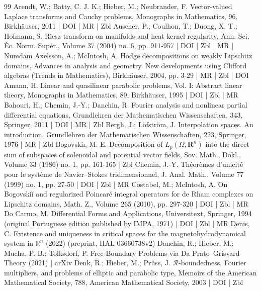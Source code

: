 \begin{thebibliography}{99}
 Arendt, W.; Batty, C. J. K.; Hieber, M.; Neubrander, F. Vector-valued Laplace transforms and Cauchy problems, Monographs in Mathematics, 96, Birkhäuser, 2011 | DOI | MR | Zbl
 Auscher, P.; Coulhon, T.; Duong, X. T.; Hofmann, S. Riesz transform on manifolds and heat kernel regularity, Ann. Sci. Éc. Norm. Supér., Volume 37 (2004) no. 6, pp. 911-957 | DOI | Zbl | MR | Numdam
 Axelsson, A.; McIntosh, A. Hodge decompositions on weakly Lipschitz domains, Advances in analysis and geometry. New developments using Clifford algebras (Trends in Mathematics), Birkhäuser, 2004, pp. 3-29 | MR | Zbl | DOI
 Amann, H. Linear and quasilinear parabolic problems, Vol. I: Abstract linear theory, Monographs in Mathematics, 89, Birkhäuser, 1995 | DOI | Zbl | MR
 Bahouri, H.; Chemin, J.-Y.; Danchin, R. Fourier analysis and nonlinear partial differential equations, Grundlehren der Mathematischen Wissenschaften, 343, Springer, 2011 | DOI | MR | Zbl
 Bergh, J.; Löfström, J. Interpolation spaces. An introduction, Grundlehren der Mathematischen Wissenschaften, 223, Springer, 1976 | MR | Zbl
 Bogovskiı, M. E. Decomposition of ${L}_p(\Omega ,\mathbf{R}^n)$ into the direct sum of subspaces of solenoidal and potential vector fields, Sov. Math., Dokl., Volume 33 (1986) no. 1, pp. 161-165 | Zbl
 Chemin, J.-Y. Théorèmes d’unicité pour le système de Navier–Stokes tridimensionnel, J. Anal. Math., Volume 77 (1999) no. 1, pp. 27-50 | DOI | Zbl | MR
 Costabel, M.; McIntosh, A. On Bogovskiĭ and regularized Poincaré integral operators for de Rham complexes on Lipschitz domains, Math. Z., Volume 265 (2010), pp. 297-320 | DOI | Zbl | MR
 Do Carmo, M. Differential Forms and Applications, Universitext, Springer, 1994 (original Portuguese edition published by IMPA, 1971) | DOI | Zbl | MR
 Denis, C. Existence and uniqueness in critical spaces for the magnetohydrodynamical system in $\mathbb{R}^n$ (2022) (preprint, HAL-03660738v2)
 Danchin, R.; Hieber, M.; Mucha, P. B.; Tolksdorf, P. Free Boundary Problems via Da Prato–Grisvard Theory (2021) | arXiv
 Denk, R.; Hieber, M.; Prüss, J. $\mathcal{R}$-boundedness, Fourier multipliers, and problems of elliptic and parabolic type, Memoirs of the American Mathematical Society, 788, American Mathematical Society, 2003 | DOI | Zbl

\end{thebibliography}
